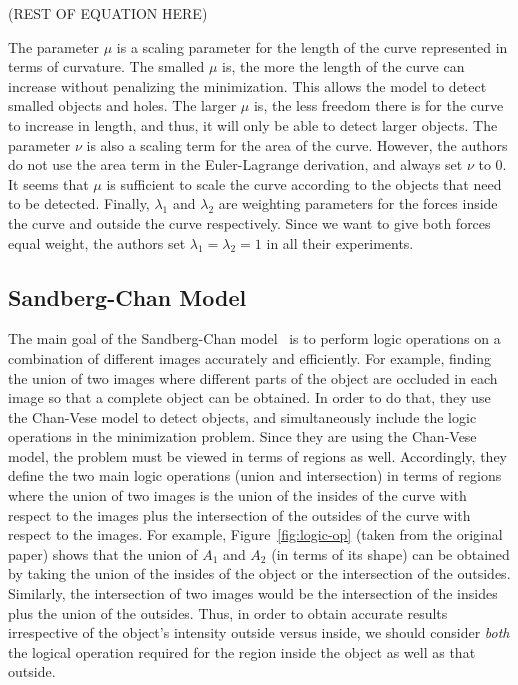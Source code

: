 \documentclass[10pt,journal,letterpaper,compsoc]{IEEEtran}
\begin{document}
(REST OF EQUATION HERE)

The parameter $\mu$ is a scaling parameter for the length of the curve represented in terms of curvature. The smalled $\mu$ is, the more the length of the curve
can increase without penalizing the minimization. This allows the model to detect smalled objects and holes. The larger $\mu$ is, the less freedom there is for
the curve to increase in length, and thus, it will only be able to detect larger objects. The parameter $\nu$ is also a scaling term for the area of the curve.
However, the authors do not use the area term in the Euler-Lagrange derivation, and always set $\nu$ to 0. It seems that $\mu$ is sufficient to scale the curve
according to the objects that need to be detected. Finally, $\lambda_{1}$ and $\lambda_{2}$ are weighting parameters for the forces inside the curve and
outside the curve respectively. Since we want to give both forces equal weight, the authors set $\lambda_{1} = \lambda_{2} = 1$ in all their experiments.



\subsection{Sandberg-Chan Model}
\label{sec:sandberg-chan}

The main goal of the Sandberg-Chan model~\cite{sandberg2005logic} is to perform logic operations on a combination of different images accurately and
efficiently. For example, finding the union of two images where different parts of the object are occluded in each image so that a complete object can be
obtained. In order to do that, they use the Chan-Vese model to detect objects, and simultaneously include the logic operations in the minimization problem.
Since they are using the Chan-Vese model, the problem must be viewed in terms of regions as well. Accordingly, they define the two main logic operations
(union and intersection) in terms of regions where the union of two images is the union of the insides of the curve with respect to the images plus the
intersection of the outsides of the curve with respect to the images. For example, Figure~\ref{fig:logic-op} (taken from the original paper) shows that the
union of $A_{1}$ and $A_{2}$ (in terms of its shape) can be obtained by taking the union of the insides of the object or the intersection of the outsides.
Similarly, the intersection of two images would be the intersection of the insides plus the union of the outsides. Thus, in order to obtain accurate results
irrespective of the object's intensity outside versus inside, we should consider \textit{both} the logical operation required for the region inside the object
as well as that outside.
\end{document}

